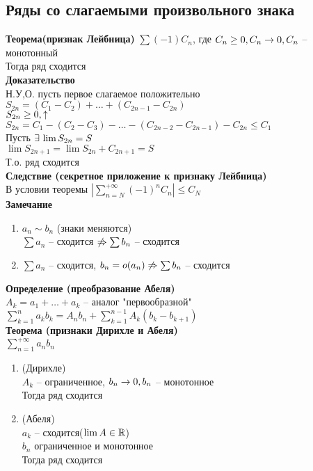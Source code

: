 \documentclass[12pt]{article}
\begin{document}
\subsection{Ряды со слагаемыми произвольного знака}
\textbf{Теорема(признак Лейбница)}\everymath{}
$\sum (-1)C_n$, где $C_n \geq 0, C_n \rightarrow 0, C_n$ -- монотонный\\
Тогда ряд сходится\\
\textbf{Доказательство}\\
Н.У,О. пусть первое слагаемое положительно\\
$S_{2n} = (C_1-C_2) + \ldots + (C_{2n-1} - C_{2n})$\\
$S_{2n} \geq 0, \uparrow$\\
$S_{2n} = C_1 - (C_2 - C_3) - \ldots - (C_{2n-2} - C_{2n-1}) - C_{2n} \leq C_1$\\
Пусть $\exists\, \lim S_{2n} = S$\\
$\lim S_{2n+1} = \lim S_{2n} + C_{2n+1} = S$\\
Т.о. ряд сходится\\
\textbf{Следствие (секретное приложение к признаку Лейбница)}\\
В условии теоремы $|\sum_{n=N}^{+\infty} (-1)^n C_n| \leq C_N$\\
\textbf{Замечание}
\begin{enumerate}
    \item $a_n \sim b_n$ (знаки меняются)\\
    $\sum a_n$ -- сходится $\not\Rightarrow \sum b_n$ -- сходится
    \item $\sum a_n$ -- сходится, $b_n = o(a_n) \not\Rightarrow \sum b_n$ -- сходится
\end{enumerate}
\textbf{Определение (преобразование Абеля)}\\
$A_k = a_1 + \ldots + a_k$ -- аналог "первообразной"\\
$\sum_{k=1}^n a_kb_k = A_nb_n + \sum_{k=1}^{n-1} A_k(b_k-b_{k+1})$\\
\textbf{Теорема (признаки Дирихле и Абеля)}\\
$\sum_{n=1}^{+\infty} a_nb_n$\\
\begin{enumerate}
    \item (Дирихле)\\
    $A_k$ -- ограниченное, $b_n \rightarrow 0, b_n$ -- монотонное\\
    Тогда ряд сходится
    \item (Абеля)\\
    $a_k$ -- сходится($\lim A \in \mathbb{R}$)\\
    $b_n$ ограниченное и монотонное\\
    Тогда ряд сходится
\end{enumerate}
\end{document}
